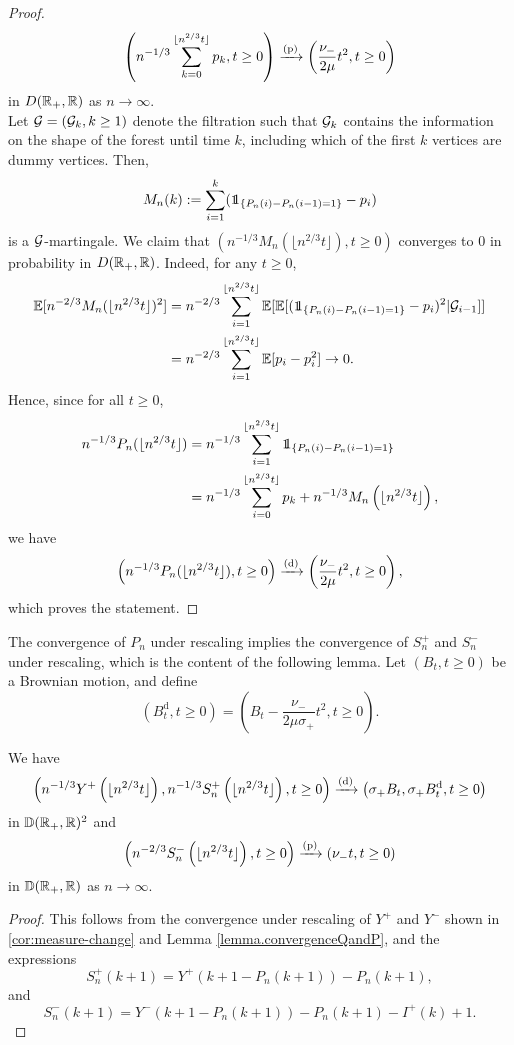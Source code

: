 \begin{proof}
$$\left(n^{-1/3}\sum_{k=0}^{\lfloor n^{2/3}t \rfloor} p_k , t \geq 0\right)\xrightarrow[]{\mathrm{(p)}} \left(\frac{\nu_-}{2\mu}t^2,t\geq 0\right)$$
in $D({\mathbb R}_+,{\mathbb R})$ as $n\to \infty$. \\
Let ${\mathcal G}=({\mathcal G}_k,k\geq 1)$ denote the filtration such that ${\mathcal G}_{k}$ contains the information on the shape of the forest until time $k$, including which of the first $k$ vertices are dummy vertices. Then, 
$$M_n(k):=\sum_{i=1}^k (\one_{\{P_n(i)-P_n(i-1)=1\}}-p_i)$$ is a ${\mathcal G}$-martingale. We claim that $(n^{-1/3}M_n(\lfloor n^{2/3} t\rfloor ), t\geq 0)$ converges to $0$ in probability in $D({\mathbb R}_+,{\mathbb R})$. Indeed, for any $t\geq 0$,
\begin{align*}\E[n^{-2/3}M_n(\lfloor n^{2/3} t\rfloor )^2]&=n^{-2/3}\sum_{i=1}^{\lfloor n^{2/3} t\rfloor} \E[\E[(\one_{\{P_n(i)-P_n(i-1)=1\}}-p_i)^2|\cG_{i-1}]]\\&=n^{-2/3}\sum_{i=1}^{\lfloor n^{2/3} t\rfloor} \E[p_i-p_i^2]\to 0.\end{align*}
Hence, since for all $t\geq 0$,
\begin{align*}n^{-1/3}P_n(\lfloor n^{2/3}t\rfloor)&=n^{-1/3}\sum_{i=1}^{\lfloor n^{2/3}t\rfloor}  \one_{\{P_n(i)-P_n(i-1)=1\}}\\
&= n^{-1/3}\sum_{i=0}^{\lfloor n^{2/3}t \rfloor} p_k + n^{-1/3} M_n\left(\lfloor n^{2/3}t\rfloor\right),
\end{align*}
we have
$$\left(n^{-1/3}P_n(\lfloor n^{2/3}t\rfloor),t\geq 0\right)\xrightarrow[]{\mathrm{(d)}}  \left( \frac{\nu_-}{2\mu}t^2, t\geq 0 \right),$$
 which proves the statement.

\end{proof}

The convergence of $P_n$ under rescaling implies the convergence of $S^{+}_n$ and $S^{-}_n$ under rescaling, which is the content of the following lemma. Let $(B_t,t\geq 0)$ be a Brownian motion, and define 
$$({B}^{\mathrm{d}}_t,t\geq 0)=\left(B_t-\frac{\nu_-}{2\mu\sigma_+}t^2,t\geq 0\right).$$ 

\begin{lemma}
\label{lem:lukasiewiczpathpurplevertices}
 We have 
 \begin{align*}\left(n^{-1/3}Y^{+}\left(\lfloor n^{2/3}t\rfloor\right), n^{-1/3}S^{+}_n\left(\lfloor n^{2/3}t\rfloor\right), t\geq 0\right)\xrightarrow[]{\mathrm{(d)}}\left(\sigma_+B_t,\sigma_+B^{\mathrm{d}}_t,  t\geq 0\right)\end{align*}
 in ${\mathbb D}({\mathbb R}_+,{\mathbb R})^2$  and 
 $$\left(n^{-2/3}S^{-}_n\left(\lfloor n^{2/3}t\rfloor\right),t\geq 0\right)\xrightarrow[]{\mathrm{(p)}}\left(\nu_- t,t\geq 0\right)$$
 in ${\mathbb D}({\mathbb R}_+,{\mathbb R})$ as $n\to\infty$.
\end{lemma}
\begin{proof}
 This follows from the convergence under rescaling of $Y^+$ and $Y^-$ shown in \cref{cor:measure-change} and Lemma \ref{lemma.convergenceQandP}, and the expressions 
 $$S_n^{+}(k+1)=Y^+\left(k+1-P_n(k+1)\right)-P_n(k+1),$$ and $$S_n^{-}(k+1)=Y^-\left(k+1-P_n(k+1)\right)-P_n(k+1)-I^{+}(k)+1.$$
\end{proof}

